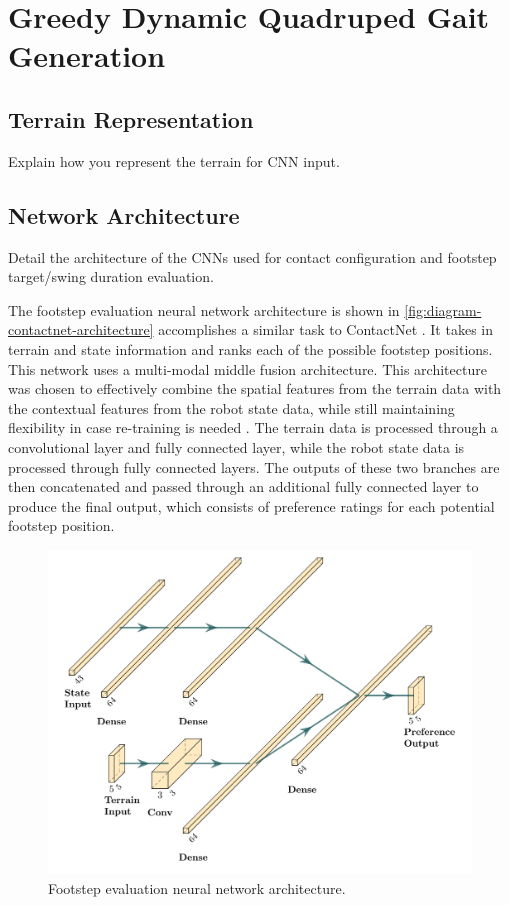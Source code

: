 \section{Greedy Dynamic Quadruped Gait Generation}

\subsection{Terrain Representation}

\begin{outline}
  Explain how you represent the terrain for CNN input.
\end{outline}

\subsection{Network Architecture}

\begin{outline}
  Detail the architecture of the CNNs used for contact configuration and footstep target/swing duration evaluation.
\end{outline}

The footstep evaluation neural network architecture is shown in \autoref{fig:diagram-contactnet-architecture} accomplishes a similar task to ContactNet \cite{bratta_contactnet_2024}. It takes in terrain and state information and ranks each of the possible footstep positions. This network uses a multi-modal middle fusion architecture. This architecture was chosen to effectively combine the spatial features from the terrain data with the contextual features from the robot state data, while still maintaining flexibility in case re-training is needed \cite{feng2021deep}. The terrain data is processed through a convolutional layer and fully connected layer, while the robot state data is processed through fully connected layers. The outputs of these two branches are then concatenated and passed through an additional fully connected layer to produce the final output, which consists of preference ratings for each potential footstep position.

\begin{figure}
  \centering
  \includegraphics[width=0.5\linewidth]{images/diagrams/nn-architecture.png}
  \caption{Footstep evaluation neural network architecture.}
  \label{fig:diagram-contactnet-architecture}
\end{figure}

